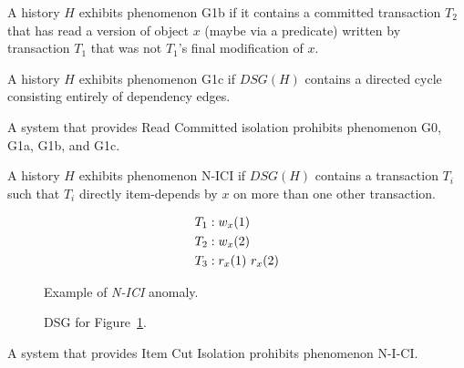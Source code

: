 \begin{definition}
A history $H$ exhibits phenomenon G1b if it contains a committed
transaction $T_2$ that has read a version of object $x$ (maybe via a
predicate) written by transaction $T_1$ that was not $T_1$’s ﬁnal
modiﬁcation of $x$.
\end{definition}

\begin{definition}
A history $H$ exhibits phenomenon G1c if $DSG(H)$ contains a directed
cycle consisting entirely of dependency edges.
\end{definition}

\begin{definition}
A system that provides Read Committed isolation prohibits phenomenon G0, G1a, G1b, and G1c.
\end{definition}

\begin{definition}
\label{def:n-ici}
A history $H$ exhibits phenomenon N-ICI if $DSG(H)$ contains a
transaction $T_i$ such that $T_i$ directly item-depends by $x$ on more
than one other transaction.
\end{definition}

\begin{figure}[H]
\begin{align*}
\small
T_1 &: w_x(1)\\
T_2 &: w_x(2)\\
T_3 &: r_x(1)~r_x(2)
\end{align*}
\caption{Example of \textit{N-ICI} anomaly.}
\label{fig:nici-history}
\end{figure}

\begin{figure}[H]
\centering
{}
\caption{DSG for Figure~\ref{fig:nici-history}.}
\label{fig:nici-dsg}
\end{figure}

\begin{definition}
A system that provides Item Cut Isolation prohibits phenomenon N-I-CI.
\end{definition}

